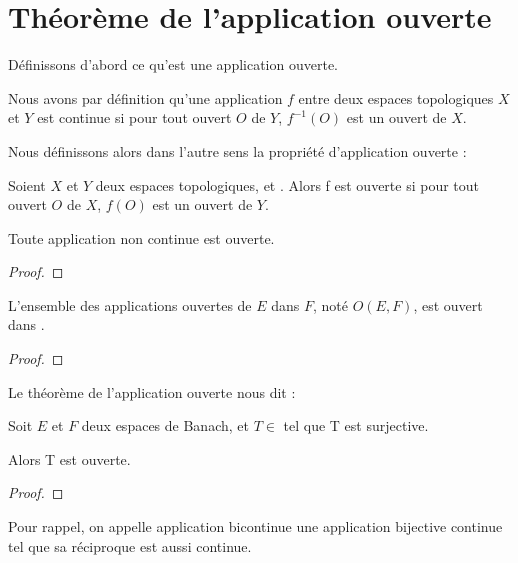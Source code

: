 \section{Théorème de l'application ouverte}

Définissons d'abord ce qu'est une application ouverte.

Nous avons par définition qu'une application $f$ entre deux espaces topologiques
$X$ et $Y$ est continue si pour tout ouvert $O$ de $Y$, $f^{-1}(O)$ est un
ouvert de $X$.

Nous définissons alors dans l'autre sens la propriété d'application ouverte :

\begin{definition}
	Soient $X$ et $Y$ deux espaces topologiques, et . Alors
	f est ouverte si pour tout ouvert $O$ de $X$, $f(O)$ est un ouvert de $Y$.
\end{definition}

\begin{proposition}
	Toute application non continue est ouverte.
\end{proposition}

\begin{proof}
	
\end{proof}

\begin{proposition}
	L'ensemble des applications ouvertes de $E$ dans $F$, noté $O(E, F)$, est
	ouvert dans .
\end{proposition}

\begin{proof}
	
\end{proof}

Le théorème de l'application ouverte nous dit :

\begin{theorem} 
	Soit $E$ et $F$ deux espaces de Banach, et $T \in$  tel
	que T est surjective.

	Alors T est ouverte.
	\label{open-application-theorem}
\end{theorem}

\begin{proof}
	
\end{proof}

Pour rappel, on appelle application bicontinue une application bijective
continue tel que sa réciproque est aussi continue.

